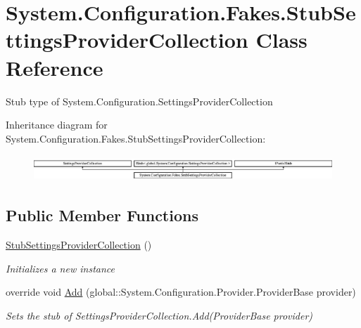 \hypertarget{class_system_1_1_configuration_1_1_fakes_1_1_stub_settings_provider_collection}{\section{System.\-Configuration.\-Fakes.\-Stub\-Settings\-Provider\-Collection Class Reference}
\label{class_system_1_1_configuration_1_1_fakes_1_1_stub_settings_provider_collection}
}


Stub type of System.\-Configuration.\-Settings\-Provider\-Collection 


Inheritance diagram for System.\-Configuration.\-Fakes.\-Stub\-Settings\-Provider\-Collection\-:\begin{figure}[H]
\begin{center}
\leavevmode
\includegraphics[height=0.974761cm]{class_system_1_1_configuration_1_1_fakes_1_1_stub_settings_provider_collection}
\end{center}
\end{figure}
\subsection*{Public Member Functions}
\begin{DoxyCompactItemize}
\item 
\hyperlink{class_system_1_1_configuration_1_1_fakes_1_1_stub_settings_provider_collection_a7682660e68f2ec2980bf26d4ab43c6c6}{Stub\-Settings\-Provider\-Collection} ()
\begin{DoxyCompactList}\small\item\em Initializes a new instance\end{DoxyCompactList}\item 
override void \hyperlink{class_system_1_1_configuration_1_1_fakes_1_1_stub_settings_provider_collection_a0ba42035391e7930b7b4929077cd5a0b}{Add} (global\-::\-System.\-Configuration.\-Provider.\-Provider\-Base provider)
\begin{DoxyCompactList}\small\item\em Sets the stub of Settings\-Provider\-Collection.\-Add(\-Provider\-Base provider)\end{DoxyCompactList}\end{DoxyCompactItemize}
